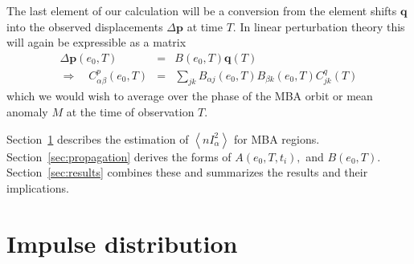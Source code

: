 \documentclass[linenumbers, onecolumn]{aastex631}
\newcommand{\vecp}{\mathbf{p}}
\newcommand{\vecq}{\mathbf{q}}
\newcommand{\matA}{A}
\newcommand{\matB}{B}
\newcommand{\covm}{C}
\begin{document}
The last element of our calculation will be a conversion from the
element shifts $\vecq$ into the observed displacements $\Delta\vecp$
at time $T.$  In linear perturbation theory this will again be expressible as a matrix
\begin{eqnarray}
\label{eq:B}
  \Delta\vecp(e_0,T) & = & \matB(e_0,T) \vecq(T) \\
  \Rightarrow \quad 
  \covm^p_{\alpha\beta}(e_0,T) & = & \sum_{jk} B_{\alpha j}(e_0,T) B_{\beta k}(e_0,T) \covm^q_{jk}(T) 
\label{eq:covp}
\end{eqnarray}
which we would wish to average over the phase of the MBA orbit or mean anomaly $M$ at the time of observation $T.$

Section~\ref{sec:impulse} describes the estimation of $\left\langle
  nI_\alpha^2\right\rangle$ for MBA regions.
Section~\ref{sec:propagation} derives the forms of $\matA(e_0,T,t_i),$
and $\matB(e_0,T).$  Section~\ref{sec:results} combines these and
summarizes the results and their implications.

\section{Impulse distribution}
\label{sec:impulse}
\end{document}
